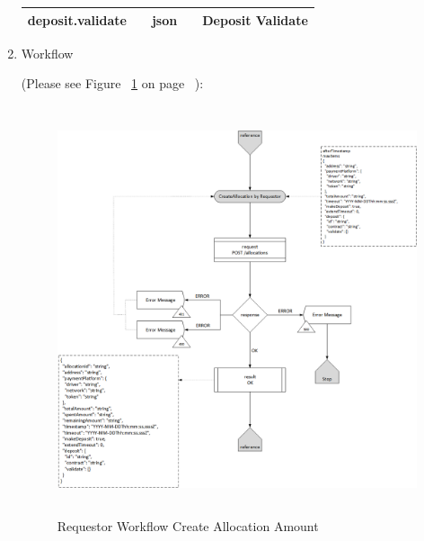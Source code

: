 \begin{enumerate}
\begin{table}[H]
\begin{center}
\begin{tabular}{|p{3cm}|l|p{3cm}|p{3cm}|p{4cm}|}
deposit.validate			&   &	json				&								&	Deposit Validate \\
\hline

\end{tabular}
\end{center}
\end{table}

\item Workflow

(Please see Figure ~\ref{fig:RCAA} on page ~\pageref{fig:RCAA}):

\begin{figure}[htbp]
    \centering
    \includegraphics[width=12cm,height=12cm,angle=0]{./diag/Workflow/Payment/CreateAllocation-R-Workflow.png}
    \caption{Requestor Workflow Create Allocation Amount }
	\label{fig:RCAA}
\end{figure}


\end{enumerate}

\newpage



